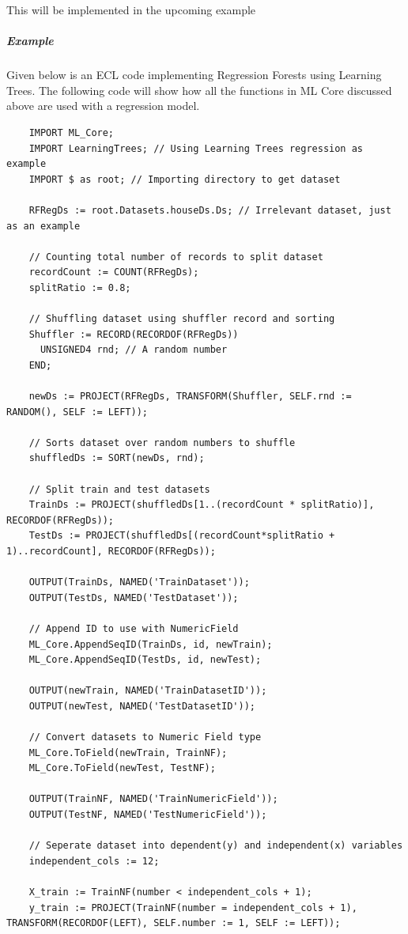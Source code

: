 \documentclass[a4paper,oneside,12pt]{book}
\begin{document}
This will be implemented in the upcoming example

\subparagraph{Example}\label{regression:example}

Given below is an ECL code implementing Regression Forests using Learning Trees. The following code will show how all the functions in ML Core discussed above are used with a regression model.

\begin{lstlisting}
    IMPORT ML_Core;
    IMPORT LearningTrees; // Using Learning Trees regression as example
    IMPORT $ as root; // Importing directory to get dataset
    
    RFRegDs := root.Datasets.houseDs.Ds; // Irrelevant dataset, just as an example
    
    // Counting total number of records to split dataset
    recordCount := COUNT(RFRegDs);
    splitRatio := 0.8;
    
    // Shuffling dataset using shuffler record and sorting
    Shuffler := RECORD(RECORDOF(RFRegDs))
      UNSIGNED4 rnd; // A random number
    END;
    
    newDs := PROJECT(RFRegDs, TRANSFORM(Shuffler, SELF.rnd := RANDOM(), SELF := LEFT));
    
    // Sorts dataset over random numbers to shuffle
    shuffledDs := SORT(newDs, rnd);
    
    // Split train and test datasets
    TrainDs := PROJECT(shuffledDs[1..(recordCount * splitRatio)], RECORDOF(RFRegDs));
    TestDs := PROJECT(shuffledDs[(recordCount*splitRatio + 1)..recordCount], RECORDOF(RFRegDs));
    
    OUTPUT(TrainDs, NAMED('TrainDataset'));
    OUTPUT(TestDs, NAMED('TestDataset'));
   
    // Append ID to use with NumericField 
    ML_Core.AppendSeqID(TrainDs, id, newTrain);
    ML_Core.AppendSeqID(TestDs, id, newTest);
    
    OUTPUT(newTrain, NAMED('TrainDatasetID'));
    OUTPUT(newTest, NAMED('TestDatasetID'));
    
    // Convert datasets to Numeric Field type
    ML_Core.ToField(newTrain, TrainNF);
    ML_Core.ToField(newTest, TestNF);
    
    OUTPUT(TrainNF, NAMED('TrainNumericField'));
    OUTPUT(TestNF, NAMED('TestNumericField'));
    
    // Seperate dataset into dependent(y) and independent(x) variables
    independent_cols := 12;
    
    X_train := TrainNF(number < independent_cols + 1);
    y_train := PROJECT(TrainNF(number = independent_cols + 1), TRANSFORM(RECORDOF(LEFT), SELF.number := 1, SELF := LEFT));
    

\end{lstlisting}
\end{document}

